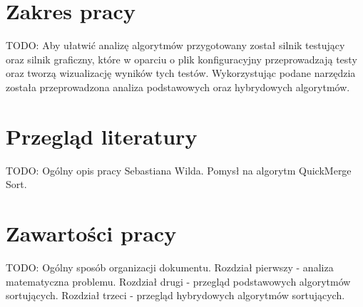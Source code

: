 
\section{Zakres pracy}
TODO: Aby ułatwić analizę algorytmów przygotowany został silnik testujący oraz silnik graficzny, które w oparciu o plik
konfiguracyjny przeprowadzają testy oraz tworzą wizualizację wyników tych testów. Wykorzystując podane narzędzia
została przeprowadzona analiza podstawowych oraz hybrydowych algorytmów.

\section{Przegląd literatury}
TODO: Ogólny opis pracy Sebastiana Wilda. Pomysł na algorytm QuickMerge Sort.

\section{Zawartości pracy}
TODO: Ogólny sposób organizacji dokumentu.
Rozdział pierwszy - analiza matematyczna problemu.
Rozdział drugi - przegląd podstawowych algorytmów sortujących.
Rozdział trzeci - przegląd hybrydowych algorytmów sortujących.